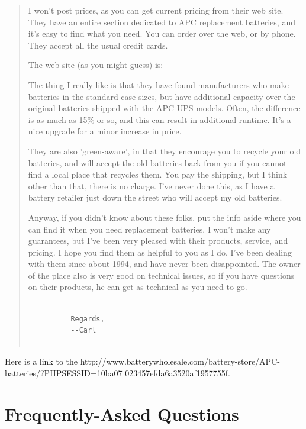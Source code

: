 {{{{{{{{{\begin{quote}
I won't post prices, as you can get current pricing from their web site. They
have an entire section dedicated to APC replacement batteries, and it's easy
to find what you need. You can order over the web, or by phone. They accept
all the usual credit cards.  

The web site (as you might guess) is: 

The thing I really like is that they have found manufacturers who make
batteries in the standard case sizes, but have additional capacity over the
original batteries shipped with the APC UPS models. Often, the difference is
as much as 15\% or so, and this can result in additional runtime. It's a nice
upgrade for a minor increase in price.  

They are also 'green-aware', in that they encourage you to recycle your old
batteries, and will accept the old batteries back from you if you cannot find
a local place that recycles them. You pay the shipping, but I think other than
that, there is no charge. I've never done this, as I have a battery retailer
just down the street who will accept my old batteries.  

Anyway, if you didn't know about these folks, put the info aside where you can
find it when you need replacement batteries. I won't make any guarantees, but
I've been very pleased with their products, service, and pricing. I hope you
find them as helpful to you as I do. I've been dealing with them since about
1994, and have never been disappointed. The owner of the place also is very
good on technical issues, so if you have questions on their products, he can
get as technical as you need to go.  

\footnotesize
\begin{verbatim}
          
          Regards,
          --Carl
     
\end{verbatim}
\normalsize

\end{quote}

Here is a link to the 
{http://www.batterywholesale.com/battery-store/APC-batteries/?PHPSESSID=10ba07%
023457efda6a3520af1957755f}. 

\label{Frequently_002dAsked-Questions}

\section*{Frequently-Asked Questions}

}}}}}}}}}
